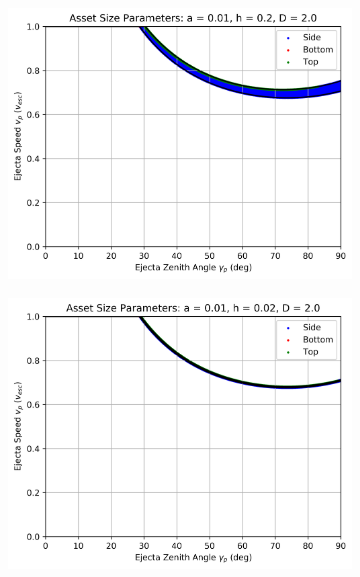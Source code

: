 \documentclass{article}
\begin{document}
\begin{figure}
	\begin{subfigure}[t]{.32\textwidth}
		\centering
		\includegraphics[width=.98\linewidth]{asset_speed_zenith_plot_1.000e-02_2.000e-01_2.000e+00.png}  
		\label{fig:sub-asset_speed_zenith_10}
	\end{subfigure}
	\begin{subfigure}[t]{.32\textwidth}
		\centering
		\includegraphics[width=.98\linewidth]{asset_speed_zenith_plot_1.000e-02_2.000e-02_2.000e+00.png}  
		\label{fig:sub-asset_speed_zenith_11}
	\end{subfigure}

\end{figure}
\end{document}
